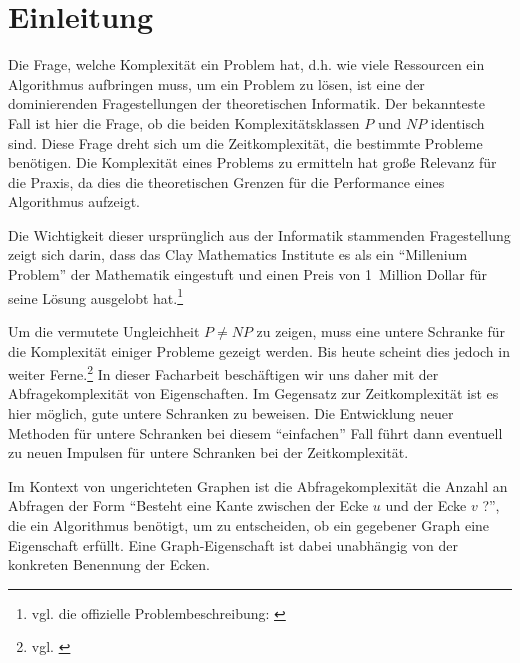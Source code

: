 \documentclass[10pt,a4paper, footheight=1mm]{scrreprt}
\theoremstyle{definition}
\begin{document}



\begin{large}
\tableofcontents
\end{large}

\thispagestyle{empty}

\chapter{Einleitung}
Die Frage, welche Komplexität ein Problem hat, d.h.
wie viele Ressourcen ein Algorithmus aufbringen muss,
um ein Problem zu lösen, ist eine der dominierenden
Fragestellungen der theoretischen Informatik.
Der bekannteste Fall ist hier die Frage, ob die beiden
Komplexitätsklassen $P$ und $NP$ identisch sind. Diese
Frage dreht sich um die Zeitkomplexität, die bestimmte
Probleme benötigen. Die Komplexität eines Problems zu ermitteln hat
große Relevanz für die Praxis, da dies die theoretischen
Grenzen für die Performance eines Algorithmus aufzeigt.

Die Wichtigkeit dieser ursprünglich aus der Informatik
stammenden Fragestellung zeigt sich darin, dass das Clay
Mathematics Institute es als ein "`Millenium Problem"'
der Mathematik eingestuft und einen Preis von
1~Million Dollar für seine Lösung ausgelobt hat.\footnote{
vgl. die offizielle Problembeschreibung:
\cite{PvsNPOfficial}} 

Um die vermutete Ungleichheit $P\neq NP$ zu zeigen,
muss eine untere Schranke für die Komplexität einiger
Probleme gezeigt werden. Bis heute scheint dies jedoch
in weiter Ferne.\footnote{vgl. \cite{PvsNP}}
In dieser Facharbeit beschäftigen wir uns daher mit
der  Abfragekomplexität von Eigenschaften. Im Gegensatz
zur Zeitkomplexität ist es hier möglich, gute
untere Schranken zu beweisen. Die Entwicklung
neuer Methoden für untere Schranken bei diesem "`einfachen"' Fall
führt dann eventuell zu neuen Impulsen für untere
Schranken bei der Zeitkomplexität.

Im Kontext von ungerichteten Graphen
ist die Abfragekomplexität die Anzahl
an Abfragen der Form "`Besteht eine Kante zwischen
der Ecke $u$ und der Ecke $v$ ?"', die ein Algorithmus
benötigt, um zu entscheiden, ob ein gegebener Graph
eine Eigenschaft erfüllt. Eine Graph-Eigenschaft ist
dabei unabhängig von der konkreten Benennung der Ecken.
\end{document}
